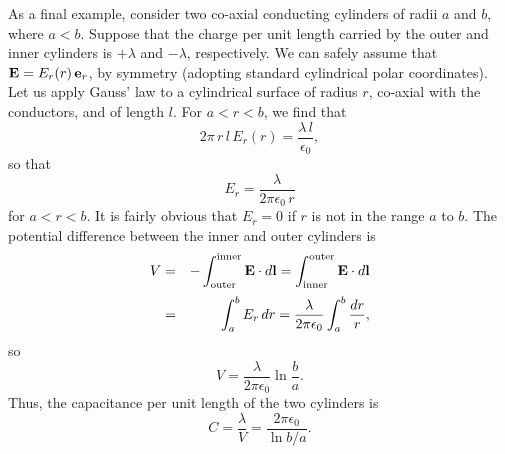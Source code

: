 As a final example, consider two co-axial
 conducting cylinders of radii $a$ and
$b$, where $a<b$. Suppose that the charge per unit length carried by the
outer and inner cylinders is $+\lambda$ and $-\lambda$, respectively. We can safely
assume that ${\bf E} = E_r(r)\, {\bf e}_r$, by symmetry (adopting
standard cylindrical polar coordinates). Let us apply
Gauss' law to a cylindrical surface of radius $r$, co-axial with the conductors, and
of length $l$. For $a<r<b$, we find that
\begin{equation}
2\pi \,r\, l\,E_r(r) = \frac{\lambda\,l}{\epsilon_0},
\end{equation}
so that
\begin{equation}
E_r = \frac{\lambda}{2\pi\epsilon_0\,r}
\end{equation}
for $a<r<b$. It is fairly obvious that $E_r=0$ if $r$ is not in the range
$a$ to $b$. The potential difference between the inner and outer cylinders is
\begin{eqnarray}
V &=& - \int_{\rm outer}^{\rm inner} {\bf E} \cdot d{\bf l} = 
\int_{\rm inner}^{\rm outer}{\bf E} \cdot d{\bf l} \nonumber\\[0.5ex]
&=& \int_a^b E_r\,dr = \frac{\lambda}{2\pi \epsilon_0} \int_a^b \frac{dr}{r},
\end{eqnarray}
so
\begin{equation}
V = \frac{\lambda}{2\pi \epsilon_0} \ln \frac{b}{a}.
\end{equation}
Thus, the capacitance per unit length of the two cylinders is
\begin{equation}
C = \frac{\lambda}{V} = \frac{2\pi\epsilon_0}{\ln b/a}.
\end{equation}

